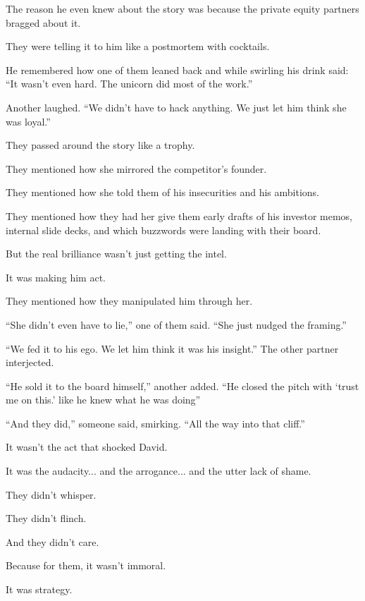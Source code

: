 \medskip

The reason he even knew about the story was because the private equity partners bragged about it.

They were telling it to him like a postmortem with cocktails.

He remembered how one of them leaned back and while swirling his drink said:
``It wasn’t even hard. The unicorn did most of the work.''

Another laughed.
``We didn’t have to hack anything. We just let him think she was loyal.''

They passed around the story like a trophy.

They mentioned how she mirrored the competitor’s founder.

They mentioned how she told them of his insecurities and his ambitions.

They mentioned how they had her give them early drafts of his investor memos, internal slide decks, 
and which buzzwords were landing with their board.

But the real brilliance wasn’t just getting the intel.

It was making him act.

They mentioned how they manipulated him through her.

``She didn’t even have to lie,'' one of them said. ``She just nudged the framing.''

``We fed it to his ego. We let him think it was his insight.'' The other partner interjected.

``He sold it to the board himself,'' another added. ``He closed the pitch with `trust me 
on this.' like he knew what he was doing''

``And they did,'' someone said, smirking. ``All the way into that cliff.''

It wasn’t the act that shocked David.

It was the audacity... and the arrogance... and the utter lack of shame.

They didn’t whisper.

They didn’t flinch.

And they didn't care.

Because for them, it wasn’t immoral.

It was strategy.

\medskip


